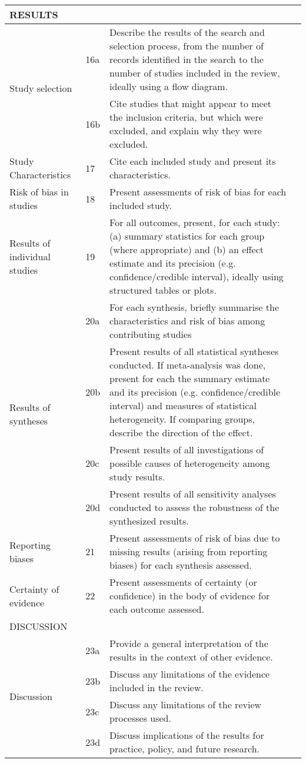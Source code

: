 \documentclass[landscape]{article}
\begin{document}
\begin{longtable}{|p{2.5cm}|p{0.5cm}|p{18cm}|p{3cm}|}
    \hline
    \multicolumn{4}{l}{RESULTS} \\
    \hline
     \multirow{2}{2.5cm}{Study selection}& 16a & Describe the results of the search and selection process, from the number of records identified in the search to the number of studies included in the review, ideally using a flow diagram. & \\
     \cline{2-4}
     & 16b & Cite studies that might appear to meet the inclusion criteria, but which were excluded, and explain why they were excluded. & \\
     \hline
     Study Characteristics &  17&  Cite each included study and present its characteristics.& \\
    \hline
     Risk of bias in studies & 18  & Present assessments of risk of bias for each included study. & \\
     \hline
     Results of individual studies & 19 &  For all outcomes, present, for each study: (a) summary statistics for each group (where appropriate) and (b) an effect estimate and its precision (e.g. confidence/credible interval), ideally using structured tables or plots.& \\
     \hline
     \multirow{4}{2.5cm}{Results of syntheses}& 20a & For each synthesis, briefly summarise the characteristics and risk of bias among contributing studies & \\
     \cline{2-4}
    & 20b & Present results of all statistical syntheses conducted. If meta-analysis was done, present for each the summary estimate and its precision (e.g. confidence/credible interval) and measures of statistical heterogeneity. If comparing groups, describe the direction of the effect. & \\
    \cline{2-4}
    & 20c & Present results of all investigations of possible causes of heterogeneity among study results.  & \\
    \cline{2-4}
    & 20d & Present results of all sensitivity analyses conducted to assess the robustness of the synthesized results. & \\
    \hline
     Reporting biases&21 & Present assessments of risk of bias due to missing results (arising from reporting biases) for each synthesis assessed.& \\
     \hline
     Certainty of evidence &22 & Present assessments of certainty (or confidence) in the body of evidence for each outcome assessed. & \\
     \hline \hline
    \multicolumn{4}{l}{DISCUSSION} \\
    \hline
    \multirow{4}{2.5cm}{Discussion}&23a  & Provide a general interpretation of the results in the context of other evidence. & \\
    \cline{2-4}
     & 23b &Discuss any limitations of the evidence included in the review. & \\
     \cline{2-4}
     & 23c &Discuss any limitations of the review processes used. & \\
     \cline{2-4}
     &  23d&Discuss implications of the results for practice, policy, and future research. & \\


\end{longtable}
\end{document}
